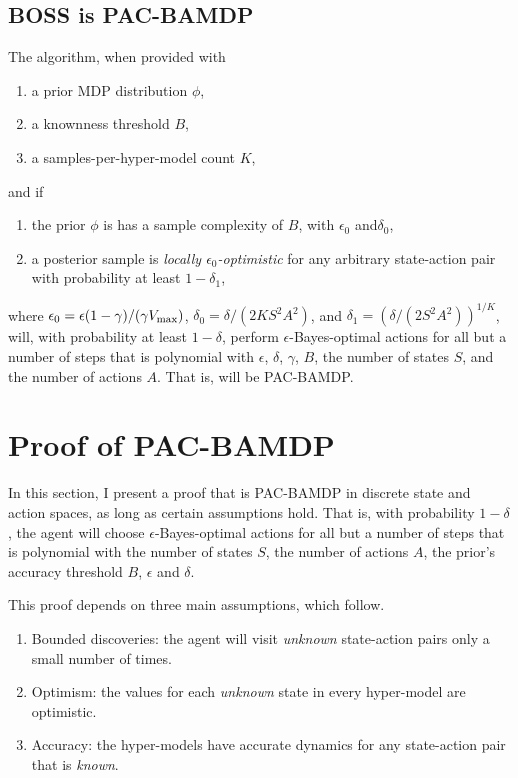 \subsection{BOSS is PAC-BAMDP}
\label{sec:boss:pac-bamdp:provisions}

\begin{thm}
\label{sec:boss:thm:pac-bamdp}
The  algorithm, when provided with
\begin{enumerate}
\item a prior MDP distribution $\phi$,
\item a knownness threshold $B$,
\item a samples-per-hyper-model count $K$,
\end{enumerate}
and if
\begin{enumerate}
\item
\label{sec:boss:pac-bamdp:cond-bed}
the prior $\phi$ is has a sample complexity of $B$, with $\epsilon_0$ and$\delta_0$,
\item 
\label{sec:boss:pac-bamdp:cond-local-opt}
a posterior sample is \emph{locally $\epsilon_0$-optimistic} for any arbitrary state-action pair with probability at least $1-\delta_1$,
\end{enumerate}
where $\epsilon_0 = \epsilon(1-\gamma)/(\gamma V_{\rm max})$, $\delta_0 = \delta/(2KS^2A^2)$, and $\delta_1 = \left(\delta/(2S^2A^2)\right)^{1/K}$,
will, with probability at least $1-\delta$, perform $\epsilon$-Bayes-optimal actions for all but a number of steps that is polynomial with $\epsilon$, $\delta$, $\gamma$, $B$, the number of states $S$, and the number of actions $A$. That is,  will be PAC-BAMDP.
\end{thm}

\section{Proof of PAC-BAMDP}
\label{sec:boss:pac-bamdp}

In this section, I present a proof that  is PAC-BAMDP in discrete state and action spaces, as long as certain assumptions hold. That is, with probability $1-\delta$, the agent will choose $\epsilon$-Bayes-optimal actions for all but a number of steps that is polynomial with the number of states $S$, the number of actions $A$, the prior's accuracy threshold $B$, $\epsilon$ and $\delta$.

This proof depends on three main assumptions, which follow.
\begin{enumerate}
\item
\label{boss:alg:disc:proof:cond:disc}
Bounded discoveries: the agent will visit \emph{unknown} state-action pairs only a small number of times.
\item
\label{boss:alg:disc:proof:cond:opt}
Optimism: the values for each \emph{unknown} state in every hyper-model are optimistic.
\item
\label{boss:alg:disc:proof:cond:acc}
Accuracy: the hyper-models have accurate dynamics for any state-action pair that is \emph{known}.
\end{enumerate}


